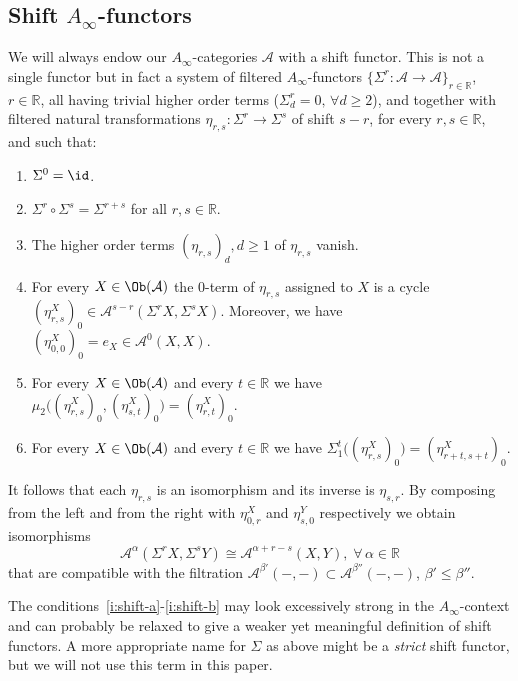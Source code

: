 \subsection{Shift $A_\infty$-functors}
We will always endow our $A_{\infty}$-categories $\mathcal{A}$ with a
shift functor. This is not a single functor but in fact a system of
filtered $A_{\infty}$-functors
$\{\Sigma^r : \mathcal{A} \longrightarrow \mathcal{A}\}_{r \in
  \mathbb{R}}$, $r \in \mathbb{R}$, all having trivial higher order
terms ($\Sigma^r_d = 0, \, \forall d \geq 2$), and together with
filtered natural transformations
$\eta_{r,s}: \Sigma^r \longrightarrow \Sigma^s$ of shift $s-r$, for
every $r,s \in \mathbb{R}$, and such that:
\begin{enumerate}
\item $\Sigma^0 = \id$. \label{i:shift-a}
\item $\Sigma^r \circ \Sigma^s = \Sigma^{r+s}$ for all $r,s \in \mathbb{R}$.
\item The higher order terms $(\eta_{r,s})_d, d \geq 1$ of
  $\eta_{r,s}$ vanish.
\item For every $X \in \Ob(\mathcal{A})$ the $0$-term of $\eta_{r,s}$
  assigned to $X$ is a cycle
  $(\eta^X_{r,s})_0 \in \mathcal{A}^{s-r}(\Sigma^rX, \Sigma^sX)$.
  Moreover, we have $(\eta^X_{0,0})_0 = e_X \in \mathcal{A}^0(X,X)$.
\item For every $X \in \Ob(\mathcal{A})$ and every $t \in \mathbb{R}$
  we have
  $\mu_2 \bigl( (\eta^X_{r,s})_0, (\eta^X_{s,t})_0 \bigr) =
  (\eta^X_{r, t})_0$.
\item For every $X \in \Ob(\mathcal{A})$ and every $t \in \mathbb{R}$
  we have
  $\Sigma_1^t \bigl( (\eta^X_{r,s})_0 \bigr) = (\eta^X_{r+t, s+t})_0$.
  \label{i:shift-b}
\end{enumerate}
It follows that each $\eta_{r,s}$ is an isomorphism and its inverse is
$\eta_{s,r}$. By composing from the left and from the right with
$\eta^X_{0,r}$ and $\eta^Y_{s,0}$ respectively we obtain isomorphisms
$$\mathcal{A}^{\alpha}(\Sigma^rX, \Sigma^sY) \cong
\mathcal{A}^{\alpha+r-s}(X,Y), \; \forall \, \alpha \in \mathbb{R}$$
that are compatible with the filtration
$\mathcal{A}^{\beta'}(- , -) \subset \mathcal{A}^{\beta''}(-,-)$,
$\beta' \leq \beta''$.


\begin{rem}
  The conditions~\eqref{i:shift-a}-\eqref{i:shift-b} may look
  excessively strong in the $A_{\infty}$-context and can probably be
  relaxed to give a weaker yet meaningful definition of shift
  functors. A more appropriate name for $\Sigma$ as above might be a
  {\em strict} shift functor, but we will not use this term in this
  paper.
\end{rem}

